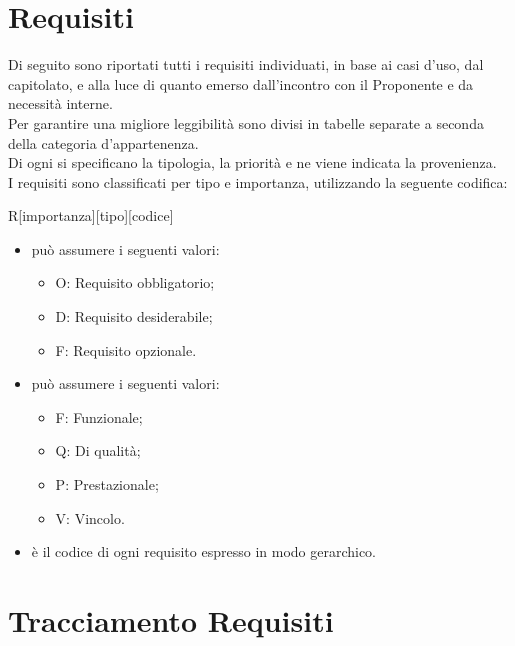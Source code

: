 

\newpage


\newpage


\newpage
\section{Requisiti} %
Di seguito sono riportati tutti i requisiti individuati, in base ai casi d'uso, dal capitolato, e alla luce di quanto emerso dall'incontro con il Proponente e da necessità interne.\\
Per garantire una migliore leggibilità sono divisi in tabelle separate a seconda della categoria d'appartenenza.\\
Di ogni  si specificano la tipologia, la priorità e ne viene indicata la provenienza.\\
I requisiti sono classificati per tipo e importanza, utilizzando la seguente codifica:\\
\begin{center}
R[importanza][tipo][codice]
\end{center}

\begin{itemize}
\item {} può assumere i seguenti valori:
\begin{itemize}
\item O: Requisito obbligatorio;
\item D: Requisito desiderabile;
\item F: Requisito opzionale.
\end{itemize}

\item {} può assumere i seguenti valori:
\begin{itemize}
\item F: Funzionale;
\item Q: Di qualità;
\item P: Prestazionale;
\item V: Vincolo.
\end{itemize}

\item {} è il codice di ogni requisito espresso in modo gerarchico.
\end{itemize}



\newpage
\section{Tracciamento Requisiti}



